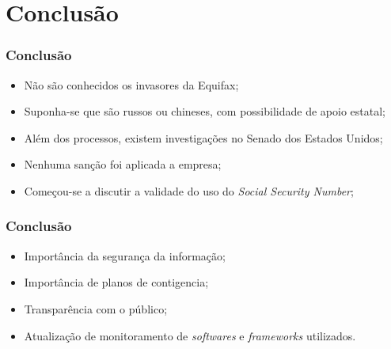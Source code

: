 \documentclass{beamer}
\begin{document}
	\section{Conclusão}
	\begin{frame}
		\frametitle{Conclusão}
		\begin{itemize}
			\item Não são conhecidos os invasores da Equifax;
			\item Suponha-se que são russos ou chineses, com possibilidade de apoio estatal;
			\item Além dos processos, existem investigações no Senado dos Estados Unidos;
			\item Nenhuma sanção foi aplicada a empresa;
			\item Começou-se a discutir a validade do uso do \textit{Social Security Number};
		\end{itemize}
	\end{frame}
	\begin{frame}
		\frametitle{Conclusão}
		\begin{itemize}
			\item Importância da segurança da informação;
			\item Importância de planos de contigencia;
			\item Transparência com o público;
			\item Atualização de monitoramento de \textit{softwares} e \textit{frameworks} utilizados.
		\end{itemize}
	\end{frame}
	\begin{frame}
		\titlepage
	\end{frame}
\end{document}
